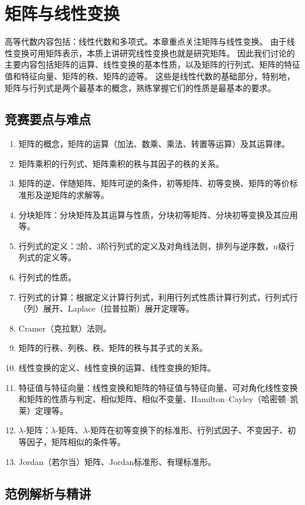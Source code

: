 \chapter{矩阵与线性变换}
高等代数内容包括：线性代数和多项式。本章重点关注矩阵与线性变换。
由于线性变换可用矩阵表示，本质上讲研究线性变换也就是研究矩阵。
因此我们讨论的主要内容包括矩阵的运算、线性变换的基本性质，以及矩阵的行列式、矩阵的特征值和特征向量、矩阵的秩、矩阵的迹等。
这些是线性代数的基础部分，特别地，矩阵与行列式是两个最基本的概念，熟练掌握它们的性质是最基本的要求。

\section{竞赛要点与难点}
\begin{enumerate}[label=（\arabic*）]
\item 矩阵的概念，矩阵的运算（加法、数乘、乘法、转置等运算）及其运算律。
\item 矩阵乘积的行列式、矩阵乘积的秩与其因子的秩的关系。
\item 矩阵的逆、伴随矩阵、矩阵可逆的条件，初等矩阵、初等变换、矩阵的等价标准形及逆矩阵的求解等。
\item 分块矩阵：分块矩阵及其运算与性质，分块初等矩阵、分块初等变换及其应用等。
\item 行列式的定义：2阶、3阶行列式的定义及对角线法则，排列与逆序数，$n$级行列式的定义等。
\item 行列式的性质。
\item 行列式的计算：根据定义计算行列式，利用行列式性质计算行列式，行列式行（列）展开、Laplace（拉普拉斯）展开定理等。
\item Cramer（克拉默）法则。
\item 矩阵的行秩、列秩、秩、矩阵的秩与其子式的关系。
\item 线性变换的定义、线性变换的运算、线性变换的矩阵。
\item 特征值与特征向量：线性变换和矩阵的特征值与特征向量、可对角化线性变换和矩阵的性质与判定、相似矩阵、相似不变量、Hamilton--Cayley（哈密顿--凯莱）定理等。
\item $\lambda$-矩阵：$\lambda$-矩阵、$\lambda$-矩阵在初等变换下的标准形、行列式因子、不变因子、初等因子，矩阵相似的条件等。
\item Jordan（若尔当）矩阵、Jordan标准形、有理标准形。
\end{enumerate}

\section{范例解析与精讲}
